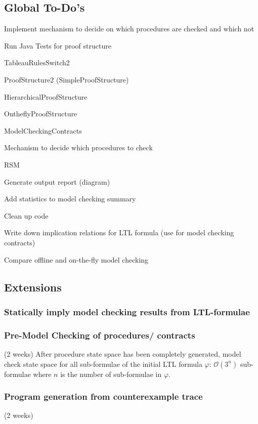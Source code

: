 \documentclass[a4paper,12pt]{article}
\newcommand{\cmark}{\ding{51}}%
\newcommand{\done}{\rlap{$\square$}{\raisebox{2pt}{\large\hspace{1pt}\cmark}}%
\hspace{-2.5pt}}
\begin{document}
\subsection{Global To-Do's}
\begin{todolist}
	\item Implement mechanism to decide on which procedures are checked and which not
	\item Run Java Tests for proof structure
		\begin{todolist}
			\item[\done] TableauRulesSwitch2
			\item[\done] ProofStructure2 (SimpleProofStructure)
			\item HierarchicalProofStructure
			\item OntheflyProofStructure
			\item ModelCheckingContracts
			\item Mechanism to decide which procedures to check
			\item RSM
		\end{todolist}
	\item Generate output report (diagram)
	\item Add statistics to model checking summary
	\item Clean up code
	\item Write down implication relations for LTL formula (use for model checking contracts)
	\item Compare offline and on-the-fly model checking
\end{todolist}

\subsection{Extensions}	
\subsubsection{Statically imply model checking results from LTL-formulae}
\subsubsection{Pre-Model Checking of procedures/ contracts}
(2 weeks)
After procedure state space has been completely generated, model check state space for all sub-formulae of the initial LTL formula  $\varphi$: $\mathcal{O}(3^n)$ sub-formulae where $n$ is the number of sub-formulae in $\varphi$.	

\subsubsection{Program generation from counterexample trace}
(2 weeks)
\end{document}
